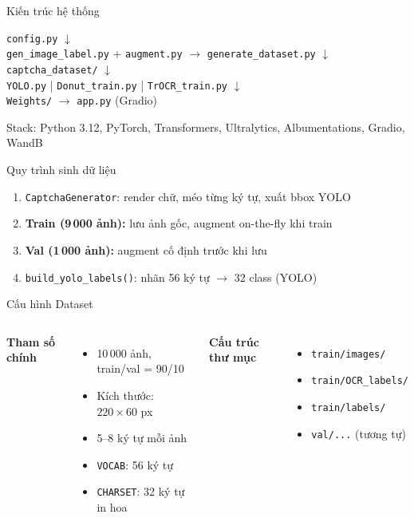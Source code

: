 \documentclass[aspectratio=169,12pt]{beamer}
\begin{document}
\begin{frame}{Kiến trúc hệ thống}
  \begin{center}
    \small
    \texttt{config.py}
    $\downarrow$\\
    \texttt{gen\_image\_label.py} + \texttt{augment.py}
    $\rightarrow$ \texttt{generate\_dataset.py}
    $\downarrow$\\
    \texttt{captcha\_dataset/}
    $\downarrow$\\
    \texttt{YOLO.py} \;|\; \texttt{Donut\_train.py} \;|\; \texttt{TrOCR\_train.py}
    $\downarrow$\\
    \texttt{Weights/} $\rightarrow$ \texttt{app.py} (Gradio)
  \end{center}

  \vspace{0.3cm}
  Stack: Python 3.12, PyTorch, Transformers, Ultralytics, Albumentations, Gradio, WandB
\end{frame}

\begin{frame}{Quy trình sinh dữ liệu}
  \begin{enumerate}
    \item \texttt{CaptchaGenerator}: render chữ, méo từng ký tự, xuất bbox YOLO
    \item \textbf{Train (9\,000 ảnh):} lưu ảnh gốc, augment on-the-fly khi train
    \item \textbf{Val (1\,000 ảnh):} augment cố định trước khi lưu
    \item \texttt{build\_yolo\_labels()}: nhãn 56 ký tự $\rightarrow$ 32 class (YOLO)
  \end{enumerate}
\end{frame}

\begin{frame}{Cấu hình Dataset}
  \begin{columns}[T]
    \textbf{Tham số chính}
    \begin{itemize}
      \item 10\,000 ảnh, train/val = 90/10
      \item Kích thước: $220 \times 60$ px
      \item 5--8 ký tự mỗi ảnh
      \item \texttt{VOCAB}: 56 ký tự
      \item \texttt{CHARSET}: 32 ký tự in hoa
    \end{itemize}

    \textbf{Cấu trúc thư mục}
    \begin{itemize}
      \item \texttt{train/images/}
      \item \texttt{train/OCR\_labels/}
      \item \texttt{train/labels/}
      \item \texttt{val/...} (tương tự)
    \end{itemize}
  \end{columns}
\end{frame}
\end{document}
